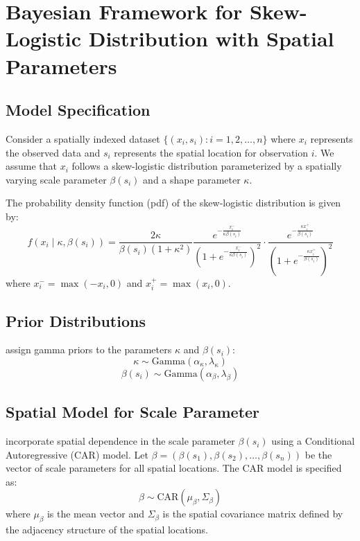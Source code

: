 \documentclass{article}
\begin{document}
\section*{Bayesian Framework for Skew-Logistic Distribution with Spatial Parameters}

\subsection*{Model Specification}

Consider a spatially indexed dataset \( \{(x_i, s_i) : i = 1, 2, \ldots, n\} \) where \( x_i \) represents the observed data and \( s_i \) represents the spatial location for observation \( i \). We assume that \( x_i \) follows a skew-logistic distribution parameterized by a spatially varying scale parameter \( \beta(s_i) \) and a shape parameter \( \kappa \).

The probability density function (pdf) of the skew-logistic distribution is given by:
\[
f(x_i \mid \kappa, \beta(s_i)) = \frac{2\kappa}{\beta(s_i)(1 + \kappa^2)} \frac{e^{-\frac{x^-_i}{\kappa \beta(s_i)}}}{(1 + e^{-\frac{x^-_i}{\kappa \beta(s_i)}})^2} \cdot \frac{e^{-\frac{\kappa x^+_i}{\beta(s_i)}}}{(1 + e^{-\frac{\kappa x^+_i}{\beta(s_i)}})^2}
\]
where \( x^-_i = \max(-x_i, 0) \) and \( x^+_i = \max(x_i, 0) \).

\subsection*{Prior Distributions}

assign gamma priors to the parameters \( \kappa \) and \( \beta(s_i) \):
\[
\kappa \sim \text{Gamma}(\alpha_{\kappa}, \lambda_{\kappa})
\]
\[
\beta(s_i) \sim \text{Gamma}(\alpha_{\beta}, \lambda_{\beta})
\]

\subsection*{Spatial Model for Scale Parameter}

incorporate spatial dependence in the scale parameter \( \beta(s_i) \) using a Conditional Autoregressive (CAR) model. Let \( \beta = (\beta(s_1), \beta(s_2), \ldots, \beta(s_n)) \) be the vector of scale parameters for all spatial locations. The CAR model is specified as:
\[
\beta \sim \text{CAR}(\mu_\beta, \Sigma_\beta)
\]
where \( \mu_\beta \) is the mean vector and \( \Sigma_\beta \) is the spatial covariance matrix defined by the adjacency structure of the spatial locations.
\end{document}
